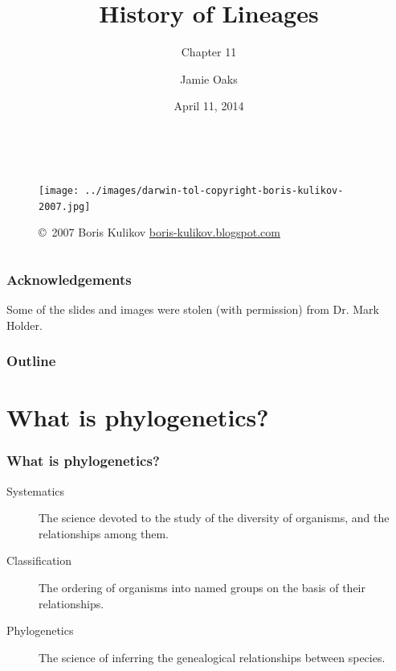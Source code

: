 



\title[History of Lineages]{History of Lineages}
\subtitle{Chapter 11}

\author[J.\ Oaks]{
    Jamie Oaks
}

\date{April 11, 2014}



\begin{frame}
    \begin{columns}[c]
            \maketitle
            \begin{figure}
                \begin{center}
                \texttt{[image: ../images/darwin-tol-copyright-boris-kulikov-2007.jpg]}
                \caption{\tiny \copyright~2007 Boris Kulikov \href{http://boris-kulikov.blogspot.com/}{boris-kulikov.blogspot.com}}
                \end{center}
            \end{figure}
    \end{columns}
\end{frame}

\begin{frame}
    \frametitle{Acknowledgements}
    Some of the slides and images were stolen (with permission) from Dr. Mark Holder.
\end{frame}

\begin{frame}
\frametitle{Outline}
\tableofcontents
\end{frame}

\section{What is phylogenetics?}
\begin{frame}
    \frametitle{What is phylogenetics?}
    \begin{description}
        \item[Systematics] The science devoted to the study of the diversity of
            organisms, and the relationships among them.
        \item[Classification] The ordering of organisms into named groups on
            the basis of their relationships.
        \item[Phylogenetics] The science of inferring the genealogical
            relationships between species.
    \end{description}
\end{frame}

